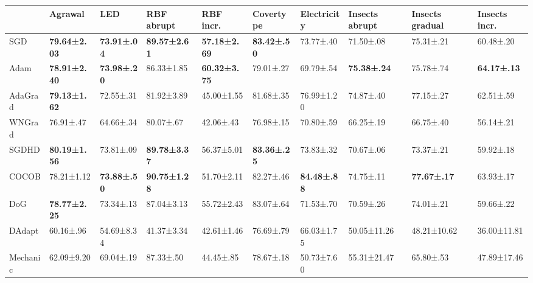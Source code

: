 \begin{tabular}{llllllllll}
    \toprule
                 & Agrawal              & LED                 & RBF abrupt           & RBF incr.            & Covertype           & Electricity         & Insects abrupt      & Insects gradual     & Insects incr.       \\\midrule
    SGD          & \bfseries 79.64±2.03 & \bfseries 73.91±.04 & \bfseries 89.57±2.61 & \bfseries 57.18±2.69 & \bfseries 83.42±.50 & 73.77±.40           & 71.50±.08           & 75.31±.21           & 60.48±.20           \\
    Adam         & \bfseries 78.91±2.40 & \bfseries 73.98±.20 & 86.33±1.85           & \bfseries 60.32±3.75 & 79.01±.27           & 69.79±.54           & \bfseries 75.38±.24 & 75.78±.74           & \bfseries 64.17±.13 \\
    AdaGrad      & \bfseries 79.13±1.62 & 72.55±.31           & 81.92±3.89           & 45.00±1.55           & 81.68±.35           & 76.99±1.20          & 74.87±.40           & 77.15±.27           & 62.51±.59           \\
    WNGrad       & 76.91±.47            & 64.66±.34           & 80.07±.67            & 42.06±.43            & 76.98±.15           & 70.80±.59           & 66.25±.19           & 66.75±.40           & 56.14±.21           \\
    SGDHD        & \bfseries 80.19±1.56 & 73.81±.09           & \bfseries 89.78±3.37 & 56.37±5.01           & \bfseries 83.36±.25 & 73.83±.32           & 70.67±.06           & 73.37±.21           & 59.92±.18           \\
    COCOB        & 78.21±1.12           & \bfseries 73.88±.50 & \bfseries 90.75±1.28 & 51.70±2.11           & 82.27±.46           & \bfseries 84.48±.88 & 74.75±.11           & \bfseries 77.67±.17 & 63.93±.17           \\
    DoG          & \bfseries 78.77±2.25 & 73.34±.13           & 87.04±3.13           & 55.72±2.43           & 83.07±.64           & 71.53±.70           & 70.59±.26           & 74.01±.21           & 59.66±.22           \\
    DAdapt       & 60.16±.96            & 54.69±8.34          & 41.37±3.34           & 42.61±1.46           & 76.69±.79           & 66.03±1.75          & 50.05±11.26         & 48.21±10.62         & 36.00±11.81         \\
    Mechanic     & 62.09±9.20           & 69.04±.19           & 87.33±.50            & 44.45±.85            & 78.67±.18           & 50.73±7.60          & 55.31±21.47         & 65.80±.53           & 47.89±17.46         \\
    \bottomrule
\end{tabular}
